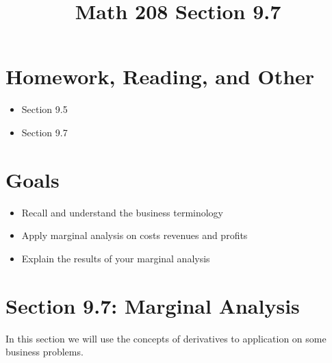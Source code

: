 \documentclass[14pt]{extarticle}
\title{\vspace{-5ex}Math 208 Section 9.7}
\date{\vspace{-10ex}}
\begin{document}
	\maketitle		
	\section*{Homework, Reading, and Other}
	\begin{itemize}
		\item Section 9.5
		\item Section 9.7
	\end{itemize}

\section{Goals}
\begin{itemize}
	\item Recall and understand the business terminology
	\item Apply marginal analysis on costs revenues and profits
	\item Explain the results of your marginal analysis
\end{itemize}
		

\section{Section 9.7: Marginal Analysis}
In this section we will use the concepts of derivatives to application on some business problems. 
\end{document}
